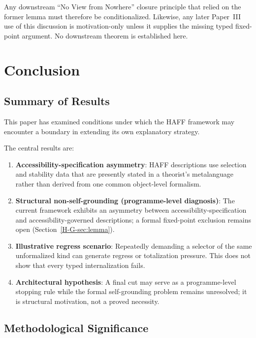 \documentclass[12pt,a4paper,openany]{book}
\begin{document}
Any downstream ``No View from Nowhere'' closure principle that relied on the former lemma must therefore be conditionalized.  Likewise, any later Paper~III use of this discussion is motivation-only unless it supplies the missing typed fixed-point argument.  No downstream theorem is established here.

\section{Conclusion}
\label{H-G-sec:conclusion}

\subsection{Summary of Results}

This paper has examined conditions under which the HAFF framework may encounter a boundary in extending its own explanatory strategy.

The central results are:

\begin{enumerate}
    \item \textbf{Accessibility-specification asymmetry}: HAFF descriptions use selection and stability data that are presently stated in a theorist's metalanguage rather than derived from one common object-level formalism.
    
    \item \textbf{Structural non-self-grounding (programme-level diagnosis)}: The current framework exhibits an asymmetry between accessibility-specification and accessibility-governed descriptions; a formal fixed-point exclusion remains open (Section~\ref{H-G-sec:lemma}).
    
    \item \textbf{Illustrative regress scenario}: Repeatedly demanding a selector of the same unformalized kind can generate regress or totalization pressure. This does not show that every typed internalization fails.
    
    \item \textbf{Architectural hypothesis}: A final cut may serve as a programme-level stopping rule while the formal self-grounding problem remains unresolved; it is structural motivation, not a proved necessity.
\end{enumerate}

\subsection{Methodological Significance}
\end{document}
